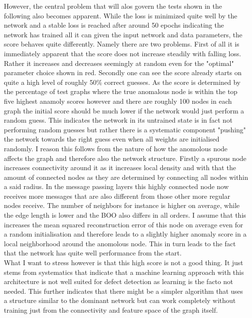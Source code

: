 \documentclass[11pt,a4paper]{article}
\begin{document}
However, the central problem that will alos govern the tests shown in the following also becomes apparent. 
While the loss is minimized quite well by the network and a stable loss is reached after around 50 epochs indicating the network has trained all it can given the input network and data parameters, the score behaves quite differently. 
Namely there are two problems. 
First of all it is immediately apparent that the score does not increase steadily with falling loss. 
Rather it increases and decreases seemingly at random even for the "optimal" parameter choice shown in red. 
Secondly one can see the score already starts on quite a high level of roughly 50\% correct guesses. 
As the score is determined by the percentage of test graphs where the true anomalous node is within the top five highest anamoly scores however and there are roughly 100 nodes in each graph the initial score should be much lower if the network would just perform a random guess. 
This indicates the network in its untrained state is in fact not performing random guesses but rather there is a systematic component "pushing" the network towards the right guess even when all weights are initialised randomly. 
I reason this follows from the nature of how the anomolous node affects the graph and therefore also the network structure. 
Firstly a spurous node increases connectivity around it as it increases local density and with that the amount of connected nodes as they are determined by connecting all nodes within a said radius. 
In the message passing layers this highly connected node now receives more messages that are also different from those other more regular nodes receive. 
The number of neighbors for instance is higher on average, while the edge length is lower and the BOO also differs in all orders. 
I assume that this increases the mean squared reconstruction error of this node on average even for a random initialisation and therefore leads to a slightly higher anomaly score in a local neighborhood around the anomolous node. 
This in turn leads to the fact that the network has quite well performance from the start. \\

What I want to stress however is that this high score is not a good thing. 
It just stems from systematics that indicate that a machine learning approach with this architecture is not well suited for defect detection as learning is the facto not needed. 
This further indicates that there might be a simpler algorithm that uses a structure similar to the dominant network but can work completely without training just from the connectivity and feature space of the graph itself. 
\end{document}
